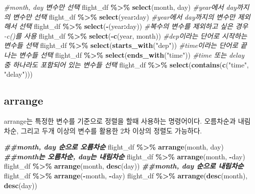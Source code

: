 \documentclass[
]{book}
\newenvironment{Shaded}{\begin{snugshade}}{\end{snugshade}}
\newcommand{\CommentTok}[1]{\textcolor[rgb]{0.56,0.35,0.01}{\textit{#1}}}
\newcommand{\DocumentationTok}[1]{\textcolor[rgb]{0.56,0.35,0.01}{\textbf{\textit{#1}}}}
\newcommand{\FunctionTok}[1]{\textcolor[rgb]{0.13,0.29,0.53}{\textbf{#1}}}
\newcommand{\NormalTok}[1]{#1}
\newcommand{\SpecialCharTok}[1]{\textcolor[rgb]{0.81,0.36,0.00}{\textbf{#1}}}
\newcommand{\StringTok}[1]{\textcolor[rgb]{0.31,0.60,0.02}{#1}}
\begin{document}
\begin{Shaded}
\begin{Highlighting}[]
\CommentTok{\#month, day 변수만 선택}
\NormalTok{flight\_df }\SpecialCharTok{\%\textgreater{}\%}
  \FunctionTok{select}\NormalTok{(month, day)}
\CommentTok{\#year에서 day까지의 변수만 선택}
\NormalTok{flight\_df }\SpecialCharTok{\%\textgreater{}\%}
  \FunctionTok{select}\NormalTok{(year}\SpecialCharTok{:}\NormalTok{day) }
\CommentTok{\#year에서 day까지의 변수만 제외해서 선택}
\NormalTok{flight\_df }\SpecialCharTok{\%\textgreater{}\%}
  \FunctionTok{select}\NormalTok{(}\SpecialCharTok{{-}}\NormalTok{(year}\SpecialCharTok{:}\NormalTok{day))}
\CommentTok{\#복수의 변수를 제외하고 싶은 경우 {-}c()를 사용}
\NormalTok{flight\_df }\SpecialCharTok{\%\textgreater{}\%}
  \FunctionTok{select}\NormalTok{(}\SpecialCharTok{{-}}\FunctionTok{c}\NormalTok{(year, month)) }
\CommentTok{\#dep이라는 단어로 시작하는 변수들 선택}
\NormalTok{flight\_df }\SpecialCharTok{\%\textgreater{}\%} 
  \FunctionTok{select}\NormalTok{(}\FunctionTok{starts\_with}\NormalTok{(}\StringTok{"dep"}\NormalTok{))}
\CommentTok{\#time이라는 단어로 끝나는 변수들 선택}
\NormalTok{flight\_df }\SpecialCharTok{\%\textgreater{}\%} 
  \FunctionTok{select}\NormalTok{(}\FunctionTok{ends\_with}\NormalTok{(}\StringTok{"time"}\NormalTok{))}
\CommentTok{\#time 또는 delay 중 하나라도 포함되어 있는 변수들 선택}
\NormalTok{flight\_df }\SpecialCharTok{\%\textgreater{}\%} 
  \FunctionTok{select}\NormalTok{(}\FunctionTok{contains}\NormalTok{(}\FunctionTok{c}\NormalTok{(}\StringTok{"time"}\NormalTok{, }\StringTok{"delay"}\NormalTok{)))}
\end{Highlighting}
\end{Shaded}

\subsection{arrange}\label{arrange}

arrange는 특정한 변수를 기준으로 정렬을 할때 사용하는 명령어이다. 오름차순과 내림차순, 그리고 두개 이상의 변수를 활용한 2차 이상의 정렬도 가능하다.

\begin{Shaded}
\begin{Highlighting}[]

\DocumentationTok{\#\#month, day 순으로 오름차순}
\NormalTok{flight\_df }\SpecialCharTok{\%\textgreater{}\%}
  \FunctionTok{arrange}\NormalTok{(month, day) }
\DocumentationTok{\#\#month는 오름차순, day는 내림차순}
\NormalTok{flight\_df }\SpecialCharTok{\%\textgreater{}\%}
  \FunctionTok{arrange}\NormalTok{(month, }\SpecialCharTok{{-}}\NormalTok{day) }
\NormalTok{flight\_df }\SpecialCharTok{\%\textgreater{}\%}
  \FunctionTok{arrange}\NormalTok{(month, }\FunctionTok{desc}\NormalTok{(day))}
\DocumentationTok{\#\#month, day 순으로 내림차순}
\NormalTok{flight\_df }\SpecialCharTok{\%\textgreater{}\%}
  \FunctionTok{arrange}\NormalTok{(}\SpecialCharTok{{-}}\NormalTok{month, }\SpecialCharTok{{-}}\NormalTok{day) }
\NormalTok{flight\_df }\SpecialCharTok{\%\textgreater{}\%}
  \FunctionTok{arrange}\NormalTok{(}\FunctionTok{desc}\NormalTok{(month), }\FunctionTok{desc}\NormalTok{(day))}
\end{Highlighting}
\end{Shaded}
\end{document}
